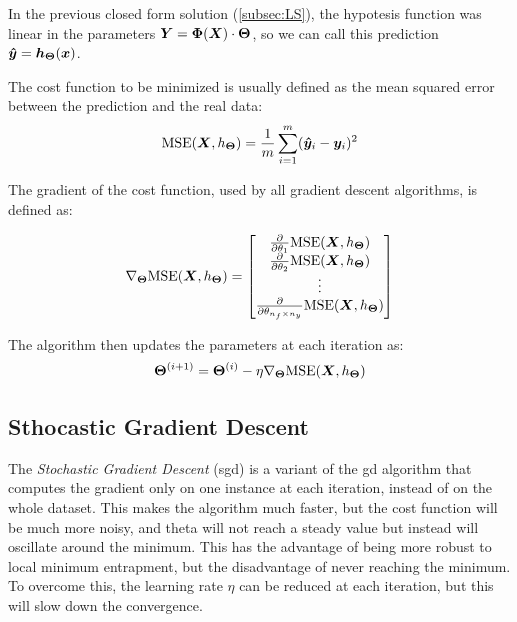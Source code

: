 In the previous closed form solution (\autoref{subsec:LS}), the hypotesis function was linear in the parameters $\bm{Y} = \bm{\Phi}(\bm{X})\cdot\bm{\Theta}$, so we can call this prediction $\bm{\hat{y}} = \bm{h}_{\bm{\Theta}}(\bm{x})$.

The cost function to be minimized is usually defined as the mean squared error between the prediction and the real data:
\begin{equation}
    \text{MSE}(\bm{X}, h_{\bm{\Theta}}) = \frac{1}{m}\sum_{i=1}^{m}(\bm{\hat{y}}_i - \bm{y}_i)^2
\end{equation}


The gradient of the cost function, used by all gradient descent algorithms, is defined as:

\begin{equation}
\nabla_{\bm{\Theta}} \text{MSE}(\bm{X}, h_{\bm{\Theta}}) = 
\begin{bmatrix}
    \frac{\partial}{\partial \theta_1} \text{MSE}(\bm{X}, h_{\bm{\Theta}}) \\
    \frac{\partial}{\partial \theta_2} \text{MSE}(\bm{X}, h_{\bm{\Theta}}) \\
    \vdots \\
    \frac{\partial}{\partial \theta_{n_f\times n_y}} \text{MSE}(\bm{X}, h_{\bm{\Theta}}) \\
\end{bmatrix}
\end{equation}

The algorithm then updates the parameters at each iteration as:
\begin{equation}
    \bm{\Theta}^{(i+1)} = \bm{\Theta}^{(i)} - \eta \nabla_{\bm{\Theta}} \text{MSE}(\bm{X}, h_{\bm{\Theta}})
\end{equation}


\subsection{Sthocastic Gradient Descent}
\label{subsec:SGD}
The \emph{Stochastic Gradient Descent} (\gls{sgd}) is a variant of the \gls{gd} algorithm that computes the gradient only on one instance at each iteration, instead of on the whole dataset. This makes the algorithm much faster, but the cost function will be much more noisy, and theta will not reach a steady value but instead will oscillate around the minimum. This has the advantage of being more robust to local minimum entrapment, but the disadvantage of never reaching the minimum. To overcome this, the learning rate $\eta$ can be reduced at each iteration, but this will slow down the convergence.

